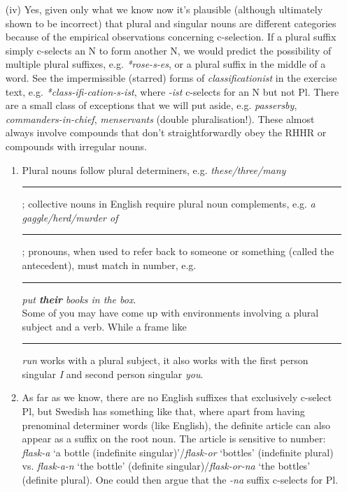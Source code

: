 \documentclass[a4paper,12pt]{article}
\begin{document}
\begin{enumerate}[label=(\roman*)]
  \item[(iv)] Yes, given only what we know now it's plausible (although ultimately shown to be incorrect) that plural and singular nouns are different categories because of the empirical observations concerning c-selection. If a plural suffix simply c-selects an N to form another N, we would predict the possibility of multiple plural suffixes, e.g. \textit{*rose-s-es}, or a plural suffix in the middle of a word. See the impermissible (starred) forms of \textit{classificationist} in the exercise text, e.g. \textit{*class-ifi-cation-s-ist}, where \textit{-ist} c-selects for an N but not Pl. There are a small class of exceptions that we will put aside, e.g. \textit{passersby}, \textit{commanders-in-chief}, \textit{menservants} (double pluralisation!). These almost always involve compounds that don't straightforwardly obey the RHHR or compounds with irregular nouns.
    \begin{enumerate}
      \item Plural nouns follow plural determiners, e.g. \textit{these/three/many} \rule{3em}{0.25pt}; collective nouns in English require plural noun complements, e.g. \textit{a gaggle/herd/murder of} \rule{3em}{0.25pt}; pronouns, when used to refer back to someone or something (called the antecedent), must match in number, e.g. \rule{3em}{0.25pt} \textit{put \textbf{their} books in the box}.\\
          Some of you may have come up with environments involving a plural subject and a verb. While a frame like \rule{3em}{0.25pt} \textit{run} works with a plural subject, it also works with the first person singular \textit{I} and second person singular \textit{you}.
      \item As far as we know, there are no English suffixes that exclusively c-select Pl, but Swedish has something like that, where apart from having prenominal determiner words (like English), the definite article can also appear as a suffix on the root noun. The article is sensitive to number: \textit{flask-a} `a bottle (indefinite singular)'/\textit{flask-or} `bottles' (indefinite plural) vs. {\textit{flask-a-n}} `the bottle' (definite singular)/\textit{flask-or-na} `the bottles' (definite plural). One could then argue that the \textit{-na} suffix c-selects for Pl.
    \end{enumerate}
\end{enumerate}
\end{document}
